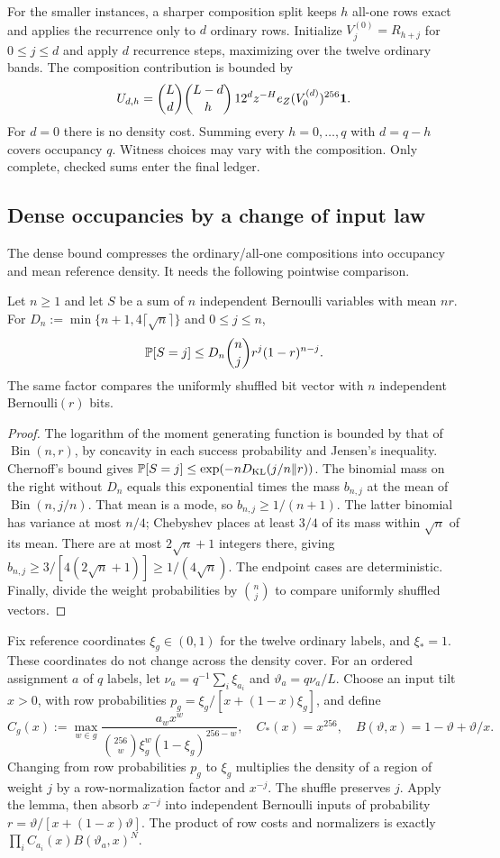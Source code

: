 For the smaller instances, a sharper composition split keeps $h$ all-one
rows exact and applies the recurrence only to $d$ ordinary rows.
Initialize $V_j^{(0)}=R_{h+j}$ for $0\le j\le d$ and apply $d$ recurrence
steps, maximizing over the twelve ordinary bands.
The composition contribution is bounded by
\[
 U_{d,h}=\binom Ld\binom{L-d}{h}\,12^d
          z^{-H}e_Z(V_0^{(d)})^{256}\mathbf 1.
\]
For $d=0$ there is no density cost. Summing every $h=0,\ldots,q$ with
$d=q-h$ covers occupancy $q$. Witness choices may vary with the composition.
Only complete, checked sums enter the final ledger.

\subsection{Dense occupancies by a change of input law}

The dense bound compresses the ordinary/all-one compositions into occupancy
and mean reference density. It needs the following pointwise comparison.

\begin{lemma}
Let $n\ge1$ and let $S$ be a sum of $n$ independent Bernoulli variables with mean $nr$.
For $D_n:=\min\{n+1,4\lceil\sqrt n\rceil\}$ and $0\le j\le n$,
\[
 \mathbb P[S=j]\le D_n\binom njr^j(1-r)^{n-j}.
\]
The same factor compares the uniformly shuffled bit vector with
$n$ independent Bernoulli$(r)$ bits.
\end{lemma}
\begin{proof}
The logarithm of the moment generating function is bounded by that of
$\operatorname{Bin}(n,r)$, by concavity in each success probability and
Jensen's inequality. Chernoff's bound gives
$\mathbb P[S=j]\le\exp(-nD_{\rm KL}(j/n\Vert r))$.
The binomial mass on the right without $D_n$ equals this exponential
times the mass $b_{n,j}$ at the mean of $\operatorname{Bin}(n,j/n)$.
That mean is a mode, so $b_{n,j}\ge1/(n+1)$.
The latter binomial has variance at most $n/4$; Chebyshev places at least
$3/4$ of its mass within $\sqrt n$ of its mean. There are at most
$2\sqrt n+1$ integers there, giving
$b_{n,j}\ge3/[4(2\sqrt n+1)]\ge1/(4\sqrt n)$.
The endpoint cases are deterministic. Finally, divide the weight
probabilities by $\binom nj$ to compare uniformly shuffled vectors.
\end{proof}

Fix reference coordinates $\xi_g\in(0,1)$ for the twelve ordinary labels,
and $\xi_*=1$. These coordinates do not change across the density cover.
For an ordered assignment $a$ of $q$ labels, let
$\nu_a=q^{-1}\sum_i\xi_{a_i}$ and $\vartheta_a=q\nu_a/L$.
Choose an input tilt $x>0$, with row probabilities
$p_g=\xi_g/[x+(1-x)\xi_g]$, and define
\[
 C_g(x):=\max_{w\in g}
   \frac{a_wx^w}{\binom{256}{w}\xi_g^w(1-\xi_g)^{256-w}},
 \quad C_*(x)=x^{256},
 \quad B(\vartheta,x)=1-\vartheta+\vartheta/x.
\]
Changing from row probabilities $p_g$ to $\xi_g$ multiplies the density of a
region of weight $j$ by a row-normalization factor and $x^{-j}$.
The shuffle preserves $j$. Apply the lemma, then absorb $x^{-j}$ into
independent Bernoulli inputs of probability
$r=\vartheta/[x+(1-x)\vartheta]$. The product of row costs and normalizers
is exactly $\prod_i C_{a_i}(x)B(\vartheta_a,x)^N$.

